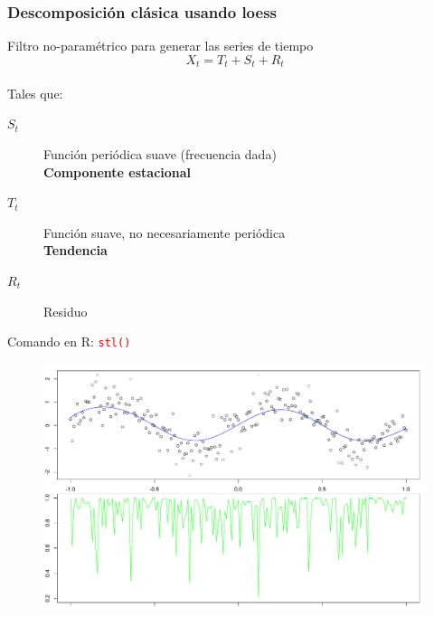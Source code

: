 \documentclass[11pt]{beamer}
\begin{document}
\begin{frame}\frametitle{Descomposición cl\'asica usando loess}

Filtro no-param\'etrico para generar las series de tiempo
\begin{equation*}
X_t = T_t + S_t + R_t
\end{equation*}\\

Tales que:\\
\begin{description}
\item[$S_t$] Función peri\'odica suave (frecuencia dada)
\\ \textbf{Componente estacional}
\item[$T_t$] Función suave, no necesariamente peri\'odica
\\ \textbf{Tendencia}
\item[$R_t$] Residuo
\end{description}

Comando en R: \textcolor{red}{\texttt{stl()}}
\end{frame}


\begin{frame}[fragile]
\begin{figure}[h]
\includegraphics[width=\linewidth]{./img_old/stl_demo2_1.pdf} 
\end{figure}
\end{frame}

\end{document}
